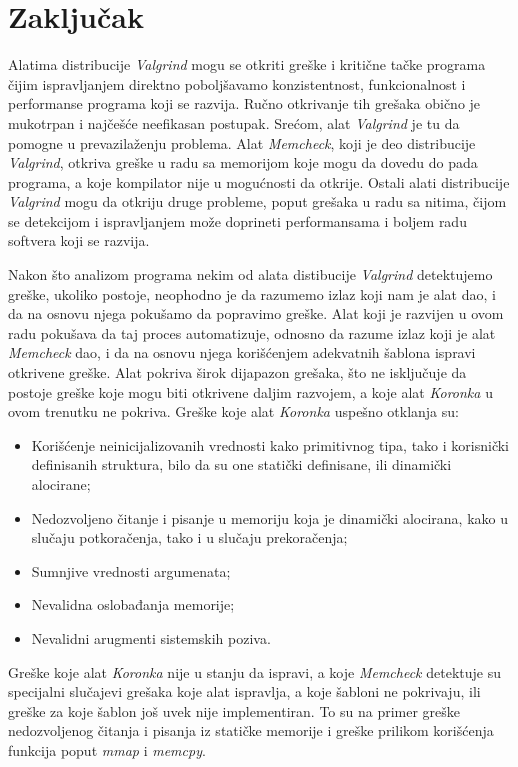 \documentclass[12pt,oneside]{memoir}
\theoremstyle{plain}
\theoremstyle{definition}
\begin{document}

\chapter{Zaključak}
Alatima distribucije \textit{Valgrind} mogu se otkriti greške i kritične tačke programa čijim ispravljanjem direktno poboljšavamo konzistentnost, funkcionalnost i performanse programa koji se razvija. Ručno otkrivanje tih grešaka obično je mukotrpan i najčešće neefikasan postupak. Srećom, alat \textit{Valgrind} je tu da pomogne u prevazilaženju problema. Alat \textit{Memcheck}, koji je deo distribucije \textit{Valgrind}, otkriva greške u radu sa memorijom koje mogu da dovedu do pada programa, a koje kompilator nije u mogućnosti da otkrije. Ostali alati distribucije \textit{Valgrind} mogu da otkriju druge probleme, poput grešaka u radu sa nitima, čijom se detekcijom i ispravljanjem može doprineti performansama i boljem radu softvera koji se razvija. 

Nakon što analizom programa nekim od alata distibucije \textit{Valgrind} detektujemo greške, ukoliko postoje, neophodno je da razumemo izlaz koji nam je alat dao, i da na osnovu njega pokušamo da popravimo greške. Alat koji je razvijen u ovom radu pokušava da taj proces automatizuje, odnosno da razume izlaz koji je alat \textit{Memcheck} dao, i da na osnovu njega korišćenjem adekvatnih šablona ispravi otkrivene greške. Alat pokriva širok dijapazon grešaka, što ne isključuje da postoje greške koje mogu biti otkrivene daljim razvojem, a koje alat \textit{Koronka} u ovom trenutku ne pokriva. Greške koje alat \textit{Koronka} uspešno otklanja su:
\begin{itemize}
\item Korišćenje neinicijalizovanih vrednosti kako primitivnog tipa, tako i korisnički definisanih struktura, bilo da su one statički definisane, ili dinamički alocirane;
\item Nedozvoljeno čitanje i pisanje u memoriju koja je dinamički alocirana, kako u slučaju potkoračenja, tako i u slučaju prekoračenja;
\item Sumnjive vrednosti argumenata;
\item Nevalidna oslobađanja memorije;
\item Nevalidni arugmenti sistemskih poziva.
\end{itemize}
Greške koje alat \textit{Koronka} nije u stanju da ispravi, a koje \textit{Memcheck} detektuje su specijalni slučajevi grešaka koje alat ispravlja, a koje šabloni ne pokrivaju, ili greške za koje šablon još uvek nije implementiran.
To su na primer greške nedozvoljenog čitanja i pisanja iz statičke memorije i greške prilikom korišćenja funkcija poput \textit{mmap} i \textit{memcpy}.
\end{document}
